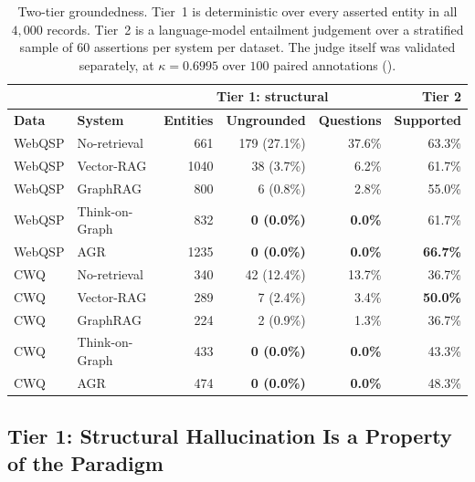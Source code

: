 \begin{table}[!tb]
  \begin{center}
    \caption[Two-tier groundedness]{Two-tier groundedness. Tier~1 is
    deterministic over every asserted entity in all $4{,}000$ records. Tier~2 is
    a language-model entailment judgement over a stratified sample of $60$
    assertions per system per dataset. The judge itself was validated
    separately, at $\kappa = 0.6995$ over $100$ paired annotations
    ().}
    \label{tab:groundedness}
    \small
    \begin{tabular}{|l|l|r|r|r|r|}
      \hline
      & & \multicolumn{3}{c|}{\textbf{Tier 1: structural}} & \textbf{Tier 2} \\
      \hline
      \textbf{Data} & \textbf{System} & \textbf{Entities} & \textbf{Ungrounded}
      & \textbf{Questions} & \textbf{Supported} \\
      \hline
      WebQSP & No-retrieval   & 661  & 179 (27.1\%) & 37.6\% & 63.3\% \\
      WebQSP & Vector-RAG     & 1040 & 38 (3.7\%)   & 6.2\%  & 61.7\% \\
      WebQSP & GraphRAG       & 800  & 6 (0.8\%)    & 2.8\%  & 55.0\% \\
      WebQSP & Think-on-Graph & 832  & \textbf{0 (0.0\%)} & \textbf{0.0\%} &
        61.7\% \\
      WebQSP & AGR            & 1235 & \textbf{0 (0.0\%)} & \textbf{0.0\%} &
        \textbf{66.7\%} \\
      \hline
      CWQ & No-retrieval   & 340 & 42 (12.4\%) & 13.7\% & 36.7\% \\
      CWQ & Vector-RAG     & 289 & 7 (2.4\%)   & 3.4\%  & \textbf{50.0\%} \\
      CWQ & GraphRAG       & 224 & 2 (0.9\%)   & 1.3\%  & 36.7\% \\
      CWQ & Think-on-Graph & 433 & \textbf{0 (0.0\%)} & \textbf{0.0\%} & 43.3\%
        \\
      CWQ & AGR            & 474 & \textbf{0 (0.0\%)} & \textbf{0.0\%} & 48.3\%
        \\
      \hline
    \end{tabular}
  \end{center}
\end{table}

\subsection{Tier 1: Structural Hallucination Is a Property of the Paradigm}

